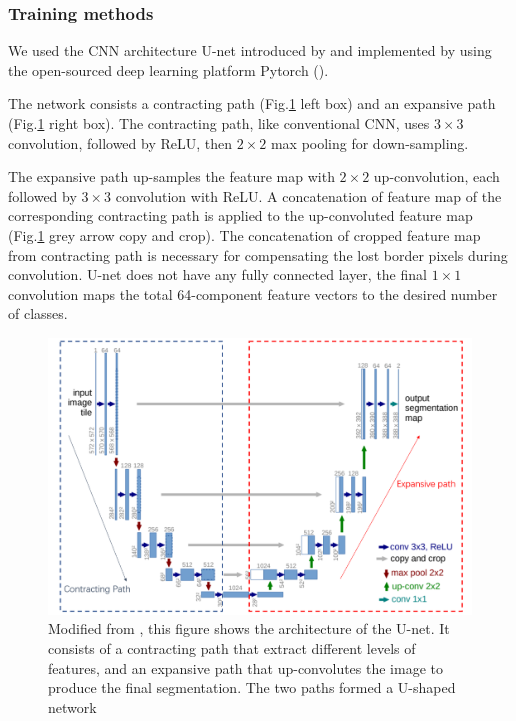 \documentclass[draft,linenumbers]{agujournal2018}
\begin{document}
\subsubsection{Training methods}
We used the CNN architecture U-net introduced by \citet{ronneberger2015u} and implemented by \citet{Jorispytorch} using the open-sourced deep learning platform Pytorch (\citet{paszke2017automatic}). 

The network consists a contracting path (Fig.\ref{unet} left box) and an expansive path (Fig.\ref{unet} right box). The contracting path, like conventional CNN, uses $3\times3$ convolution, followed by ReLU, then $2\times2$ max pooling for down-sampling. 

The expansive path up-samples the feature map with $2\times2$ up-convolution, each followed by $3\times3$ convolution with ReLU. A concatenation of feature map of the corresponding contracting path is applied to the up-convoluted feature map (Fig.\ref{unet} grey arrow copy and crop). The concatenation of cropped feature map from contracting path is necessary for compensating the lost border pixels during convolution. U-net does not have any fully connected layer, the final $1\times1$ convolution maps the total 64-component feature vectors to the desired number of classes. 

\begin{figure}[h]
\centering
\includegraphics[width=33pc]{imgs/unet.png}
\caption{Modified from \citet{ronneberger2015u}, this figure shows the architecture of the U-net. It consists of a contracting path that extract different levels of features, and an expansive path that up-convolutes the image to produce the final segmentation. The two paths formed a U-shaped network}
\label{unet}
\end{figure}
\end{document}
